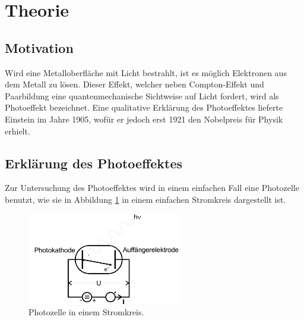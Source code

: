 \section{Theorie}
\label{sec:Theorie}

\subsection{Motivation}

Wird eine Metalloberfläche mit Licht bestrahlt, ist es möglich Elektronen aus dem Metall zu lösen.
Dieser Effekt, welcher neben Compton-Effekt und Paarbildung eine quantenmechanische Sichtweise auf Licht fordert, wird als Photoeffekt bezeichnet.
Eine qualitative Erklärung des Photoeffektes lieferte Einstein im Jahre 1905, wofür er jedoch erst 1921 den Nobelpreis für Physik erhielt. %

\subsection{Erklärung des Photoeffektes}
Zur Untersuchung des Photoeffektes wird in einem einfachen Fall eine Photozelle benutzt, wie sie in Abbildung \ref{abb:1} in einem einfachen Stromkreis dargestellt ist.

\begin{figure}[H]
  \centering
  \includegraphics[height=4cm]{ressources/aufbau.png}
  \caption{Photozelle in einem Stromkreis. \cite{skript}}
  \label{abb:1}
\end{figure}

